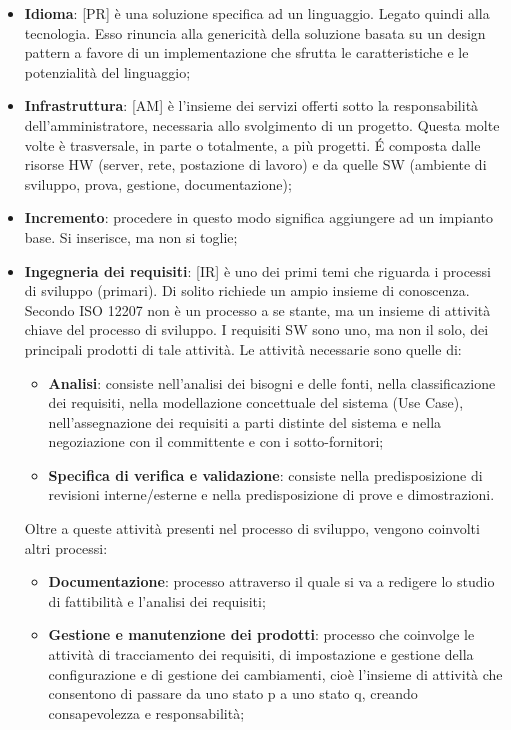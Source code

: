\begin{itemize}
	\item \textbf{Idioma}: [PR] è una soluzione specifica ad un linguaggio. Legato quindi alla tecnologia. Esso rinuncia alla genericità della soluzione basata su un design pattern a favore di un implementazione che sfrutta le caratteristiche e le potenzialità del linguaggio;

	\item \textbf{Infrastruttura}: [AM] è l'insieme dei servizi offerti sotto la responsabilità dell'amministratore, necessaria allo svolgimento di un progetto. Questa molte volte è trasversale, in parte o totalmente, a più progetti. \'E composta dalle risorse HW (server, rete, postazione di lavoro) e da quelle SW (ambiente di sviluppo, prova, gestione, documentazione);

	\item \textbf{Incremento}: procedere in questo modo significa aggiungere ad un impianto base. Si inserisce, ma non si toglie;
	\item \textbf{Ingegneria dei requisiti}: [IR] è uno dei primi temi che riguarda i processi di sviluppo (primari). Di solito richiede un ampio insieme di conoscenza. Secondo ISO 12207 non è un processo a se stante, ma un insieme di attività chiave del processo di sviluppo. I requisiti SW sono uno, ma non il solo, dei principali prodotti di tale attività. Le attività necessarie sono quelle di:
		\begin{itemize}
			\item \textbf{Analisi}: consiste nell'analisi dei bisogni e delle fonti, nella classificazione dei requisiti, nella modellazione concettuale del sistema (Use Case), nell'assegnazione dei requisiti a parti distinte del sistema e nella negoziazione con il committente e con i sotto-fornitori;
			\item \textbf{Specifica di verifica e validazione}: consiste nella predisposizione di revisioni interne/esterne e nella predisposizione di prove e dimostrazioni.
		\end{itemize}
	\noindent
	Oltre a queste attività presenti nel processo di sviluppo, vengono coinvolti altri processi:
		\begin{itemize}
			\item \textbf{Documentazione}: processo attraverso il quale si va a redigere lo studio di fattibilità e l'analisi dei requisiti;
			\item \textbf{Gestione e manutenzione dei prodotti}: processo che coinvolge le attività di tracciamento dei requisiti, di impostazione e gestione della configurazione e di gestione dei cambiamenti, cioè l'insieme di attività che consentono di passare da uno stato p a uno stato q, creando consapevolezza e responsabilità;
		\end{itemize}
	

\end{itemize}
